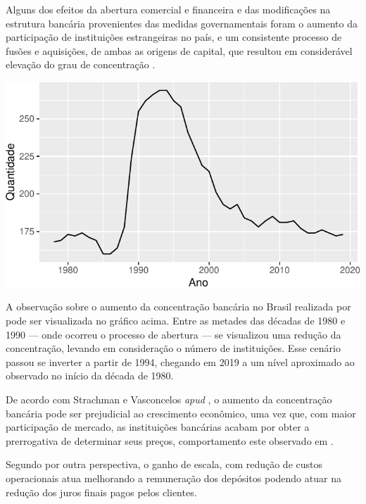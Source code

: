 \documentclass[12pt,openright,oneside,a4paper,chapter=TITLE,section=TITLE,subsection=Title,english,french,spanish,portugues,sumario=tradicional]{04-class-files/abntex2}
\begin{document}
Alguns dos efeitos da abertura comercial e financeira e das modificações na estrutura bancária provenientes das medidas governamentais foram o aumento da participação de instituições estrangeiras no país, e um consistente processo de fusões e aquisições, de ambas as origens de capital, que resultou em considerável elevação do grau de concentração \cite{camargo:2009}.


\begin{center}\includegraphics{12-exportedfigures/concetration-1} \end{center}

\label{fig:concentracao}

A observação sobre o aumento da concentração bancária no Brasil realizada por \textcite{camargo:2009} pode ser visualizada no gráfico acima. Entre as metades das décadas de 1980 e 1990 --- onde ocorreu o processo de abertura --- se visualizou uma redução da concentração, levando em consideração o número de instituições. Esse cenário passou se inverter a partir de 1994, chegando em 2019 a um nível aproximado ao observado no início da década de 1980.

De acordo com Strachman e Vasconcelos \emph{apud} \textcite{camargo:2009}, o aumento da concentração bancária pode ser prejudicial ao crescimento econômico, uma vez que, com maior participação de mercado, as instituições bancárias acabam por obter a prerrogativa de determinar seus preços, comportamento este observado em \textcite{klein:1971}.

Segundo \textcite{camargo:2009} por outra perspectiva, o ganho de escala, com redução de custos operacionais atua melhorando a remuneração dos depósitos podendo atuar na redução dos juros finais pagos pelos clientes.
\end{document}
